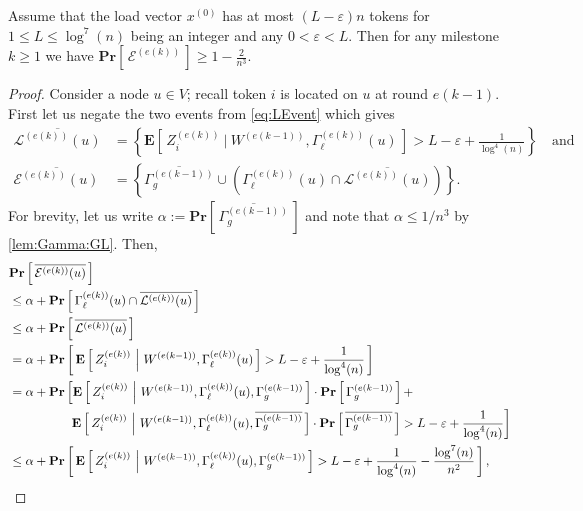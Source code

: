\documentclass[twoside,leqno]{article}
\newcommand*{\cE}{\mathcal{E}}
\newcommand*{\cL}{\mathcal{L}}
\newcommand{\Pro}[1]{\mathbf{Pr} \left[\,#1\,\right]}
\newcommand{\Ex}[1]{\mathbf{E} \left[\,#1\,\right]}
\DeclareMathOperator{\1}{\mathbf{1}}
\numberwithin{equation}{section}
\let\epsilon\varepsilon
\newcommand{\newL}{L}
\begin{document}
\begin{lemma}
\label{lem:crucialfirststatement}
Assume that the load vector $x^{(0)}$ has at most $(\newL-\epsilon) n$ tokens for $1 \leq \newL \leq \log^7 (n)$ being an integer and any $0<\epsilon<\newL$. Then for any milestone $k \geq 1$ we have $\Pro{ \cE^{(e(k))}}\geq 1- \frac{2}{n^3}$.
\end{lemma}



\begin{proof}
Consider a node $u\in V$; recall token $i$ is located on $u$ at round $e(k-1)$.  First let us negate the two events from \cref{eq:LEvent} which gives 
\begin{align*}
 \overline{\cL^{(e(k))}(u)} &= \left\{ \Ex{ Z_i^{(e(k))} ~\Big|~ W^{(e(k-1))},\Gamma_{\ell}^{(e(k))}(u) }> \newL-\epsilon + \frac{1}{\log^4(n)}\right\}\quad\mbox{and}\\
\overline{\cE^{(e(k))}(u)} &= \left\{
\overline{\Gamma_{g}^{(e(k-1))}} \cup \left( \Gamma_{\ell}^{(e(k))}(u)
\cap
\overline{\cL^{(e(k))}(u)} \right)\right\}.
\end{align*}
For brevity, let us write $\alpha:=\Pro{\overline{\Gamma_{g}^{(e(k-1))}}}$ and note that $\alpha \leq 1/n^3$ by \cref{lem:Gamma:GL}. Then,
\begin{align}
& \Pro{\overline{\cE^{(e(k))}(u)} } \notag \\
&\leq \alpha+\Pro{\Gamma_{\ell}^{(e(k))}(u) \cap \overline{\cL^{(e(k))}(u)}} 
\notag \\
&\leq \alpha+\Pro{\overline{\cL^{(e(k))}(u)}}  \notag\\
&= \alpha+\Pro{
\Ex{ Z_i^{(e(k))}~\Big|~W^{(e(k-1))},\Gamma_{\ell}^{(e(k))}(u) } > \newL -\epsilon + \frac{1}{\log^4(n)}
}  \notag\\
&=\alpha+\mathbf{Pr} \left[
\Ex{ Z_i^{(e(k))}~\Big|~W^{(e(k-1))},\Gamma_{\ell}^{(e(k))}(u), \Gamma_{g}^{(e(k-1))}} \cdot \Pro{\Gamma_{g}^{(e(k-1))}} + \right. \notag\\
& \hspace*{11ex}\left. \Ex{ Z_i^{(e(k))}~\Big|~W^{(e(k-1))},\Gamma_{\ell}^{(e(k))}(u) , \overline{\Gamma_{g}^{(e(k-1))}}}\cdot  \Pro{\overline{\Gamma_{g}^{(e(k-1))}}}> \newL -\epsilon + \frac{1}{\log^4(n)} \right] \notag
\\& \leq \alpha+\Pro{
\Ex{ Z_i^{(e(k))}~\Big|~W^{(e(k-1))},\Gamma_{\ell}^{(e(k))}(u), \Gamma_{g}^{(e(k-1))}} > \newL -\epsilon + \frac{1}{\log^4(n)} - \frac{\log^7 (n)}{n^2}}, \notag
\end{align}

\end{proof}
\end{document}
